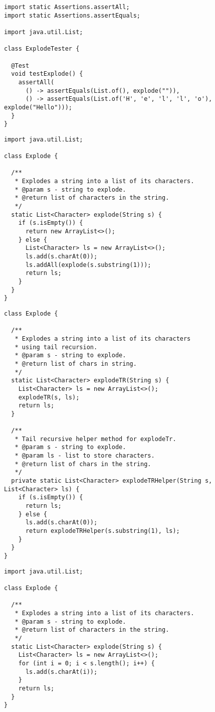 \begin{lstlisting}[language=MyJava]
import static Assertions.assertAll;
import static Assertions.assertEquals;

import java.util.List;

class ExplodeTester {
  
  @Test
  void testExplode() {
    assertAll(
      () -> assertEquals(List.of(), explode("")),
      () -> assertEquals(List.of('H', 'e', 'l', 'l', 'o'), explode("Hello")));
  }
}
\end{lstlisting}

\begin{lstlisting}[language=MyJava]
import java.util.List;

class Explode {

  /**
   * Explodes a string into a list of its characters.
   * @param s - string to explode.
   * @return list of characters in the string.
   */
  static List<Character> explode(String s) {
    if (s.isEmpty()) { 
      return new ArrayList<>();
    } else {
      List<Character> ls = new ArrayList<>();
      ls.add(s.charAt(0));
      ls.addAll(explode(s.substring(1)));
      return ls;
    }
  }
}
\end{lstlisting}

\begin{lstlisting}[language=MyJava]
class Explode {
  
  /**
   * Explodes a string into a list of its characters
   * using tail recursion.
   * @param s - string to explode.
   * @return list of chars in string.
   */
  static List<Character> explodeTR(String s) {
    List<Character> ls = new ArrayList<>();
    explodeTR(s, ls);
    return ls;
  }

  /**
   * Tail recursive helper method for explodeTr.
   * @param s - string to explode.
   * @param ls - list to store characters.
   * @return list of chars in the string.
   */
  private static List<Character> explodeTRHelper(String s, List<Character> ls) {
    if (s.isEmpty()) { 
      return ls; 
    } else {
      ls.add(s.charAt(0));
      return explodeTRHelper(s.substring(1), ls);
    }
  }
}
\end{lstlisting}

\begin{lstlisting}[language=MyJava]
import java.util.List;

class Explode {

  /**
   * Explodes a string into a list of its characters.
   * @param s - string to explode.
   * @return list of characters in the string.
   */
  static List<Character> explode(String s) {
    List<Character> ls = new ArrayList<>();
    for (int i = 0; i < s.length(); i++) {
      ls.add(s.charAt(i));
    }
    return ls;
  }
}
\end{lstlisting}

